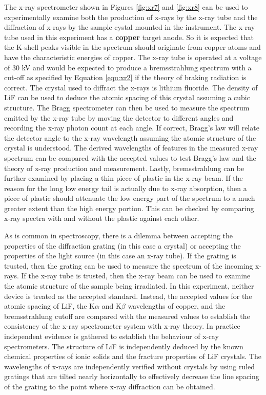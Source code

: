 The x-ray spectrometer shown in Figures \ref{fig:xr7} and \ref{fig:xr8} can be used to experimentally examine both the production of x-rays by the x-ray tube and the diffraction of x-rays by the sample cystal mounted in the instrument. The x-ray tube used in this experiment has a {\bf copper} target anode. So it is expected that the K-shell peaks visible in the spectrum should originate from copper atoms and have the characteristic energies of copper. The x-ray tube is operated at a voltage of 30 kV and would be expected to produce a bremsstrahlung spectrum with a cut-off as specified by Equation \ref{equ:xr2} if the theory of braking radiation is correct. The crystal used to diffract the x-rays is lithium fluoride. The density of LiF can be used to deduce the atomic spacing of this crystal assuming a cubic structure. The Bragg spectrometer can then be used to measure the spectrum emitted by the x-ray tube by moving the detector to different angles and recording the x-ray photon count at each angle. If correct, Bragg's law will relate the detector angle to the x-ray wavelength assuming the atomic structure of the crystal is understood. The derived wavelengths of features in the measured x-ray spectrum can be compared with the accepted values to test  Bragg's law and the theory of x-ray production and measurement. Lastly, bremsstrahlung can be further examined by placing a thin piece of plastic in the x-ray beam. If the reason for the long low energy tail is actually due to x-ray absorption, then a piece of plastic should attenuate the low energy part of the spectrum to a much greater extent than the high energy portion. This can be checked by comparing x-ray spectra with and without the plastic against each other.

As is common in spectroscopy, there is a dilemma between accepting the properties of the diffraction grating (in this case a crystal) or accepting the properties of the light source (in this case an x-ray tube). If the grating is trusted, then the grating can be used to measure the spectrum of the incoming x-rays. If the x-ray tube is trusted, then the x-ray beam can be used to examine  the atomic structure of the sample being irradiated. In this experiment, neither device is treated as the accepted standard. Instead, the accepted values for the atomic spacing of  LiF, the K$\alpha$ and K$\beta$ wavelengths of copper, and the bremsstrahlung cutoff are compared with the measured values to establish the consistency of the x-ray spectrometer system with x-ray theory. In practice independent evidence is gathered to establish the behaviour of x-ray spectrometers. The structure of LiF is independently deduced by the known chemical properties of ionic solids and the fracture properties of LiF crystals. The wavelengths of x-rays are independently verified without crystals by using ruled gratings that are tilted nearly horizontally to effectively decrease the line spacing of the grating to the point where x-ray diffraction can be obtained.

